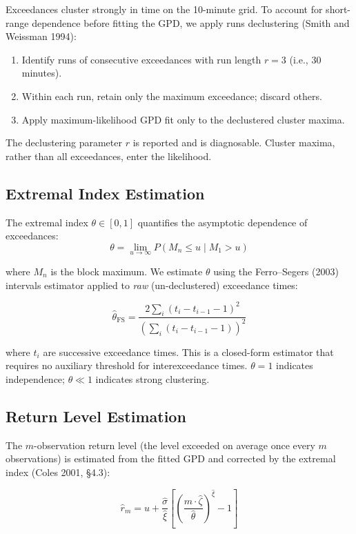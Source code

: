 Exceedances cluster strongly in time on the 10-minute grid. To account for short-range dependence before fitting the GPD, we apply runs declustering (Smith and Weissman 1994):

\begin{enumerate}
  \item Identify runs of consecutive exceedances with run length $r = 3$ (i.e., 30 minutes).
  \item Within each run, retain only the maximum exceedance; discard others.
  \item Apply maximum-likelihood GPD fit only to the declustered cluster maxima.
\end{enumerate}

The declustering parameter $r$ is reported and is diagnosable. Cluster maxima, rather than all exceedances, enter the likelihood.

\subsection{Extremal Index Estimation}

The extremal index $\theta \in [0, 1]$ quantifies the asymptotic dependence of exceedances:
\[
\theta = \lim_{u \to \infty} P(M_n \leq u \mid M_1 > u)
\]

where $M_n$ is the block maximum. We estimate $\theta$ using the Ferro--Segers (2003) intervals estimator applied to \emph{raw} (un-declustered) exceedance times:
  
\[
\hat{\theta}_{\text{FS}} = \frac{2 \sum_i (t_i - t_{i-1} - 1)^2}{\left(\sum_i (t_i - t_{i-1} - 1)\right)^2}
\]

where $t_i$ are successive exceedance times. This is a closed-form estimator that requires no auxiliary threshold for interexceedance times. $\theta = 1$ indicates independence; $\theta \ll 1$ indicates strong clustering.

\subsection{Return Level Estimation}

The $m$-observation return level (the level exceeded on average once every $m$ observations) is estimated from the fitted GPD and corrected by the extremal index (Coles 2001, \S 4.3):

\[
\hat{r}_m = u + \frac{\hat{\sigma}}{\hat{\xi}} \left[\left(\frac{m \cdot \hat{\zeta}}{\hat{\theta}}\right)^{\hat{\xi}} - 1\right]
\]

